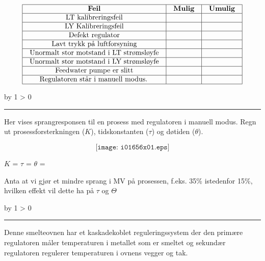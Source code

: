 \documentclass[12pt,a4paper]{article}
\def\oppgave{
            \advance\questnum by 1
            \ifnum \questnum > 0
                 \hrule
                 \vskip 3pt
                 \leftline{Oppgave \the\questnum}
                 \vskip 3pt \fi}
\begin{document}

$$\vbox{\offinterlineskip
\halign{\strut
\vrule \quad\hfil # \ \hfil & 
\vrule \quad\hfil # \ \hfil & 
\vrule \quad\hfil # \ \hfil \vrule \cr
\noalign{\hrule}
%
{\bf Feil} & {\bf Mulig} & {\bf Umulig} \cr
%
\noalign{\hrule}
%
LT kalibreringsfeil &  &  \cr
%
\noalign{\hrule}
%
LY Kalibreringsfeil &  &  \cr
%
\noalign{\hrule}
%
Defekt regulator &  &  \cr
%
\noalign{\hrule}
%
Lavt trykk på luftforsyning &  &  \cr
%
\noalign{\hrule}
%
Unormalt stor motstand i LT strømsløyfe &  &  \cr
%
\noalign{\hrule}
%
Unormalt stor motstand i LY strømsløyfe &  &  \cr
%
\noalign{\hrule}
%
Feedwater pumpe er slitt &  &  \cr
%
\noalign{\hrule}
%
Regulatoren står i manuell modus. &  &  \cr
%
\noalign{\hrule}
} %
}$$ %

\vskip 10pt \filbreak 
\oppgave{} 

Her vises sprangresponsen til en prosess med regulatoren i manuell modus. Regn ut prosessforsterkningen ($K$), tidskonstanten ($\tau$) og døtiden ($\theta$).


$$\texttt{[image: i01656x01.eps]}$$

$K$ = \underbar{\hskip 50pt} \hskip 50pt $\tau$ = \underbar{\hskip 50pt} \hskip 50pt $\theta$ = \underbar{\hskip 50pt}

\vskip 10pt

Anta at vi gjør et mindre sprang i MV på prosessen, f.eks. 35\% istedenfor 15\%, hvilken effekt vil dette ha på $\tau$ og $\Theta$


\vskip 10pt


\vskip 10pt \filbreak 
\oppgave{} 

Denne smelteovnen har et kaskadekoblet reguleringssystem der den primære regulatoren måler temperaturen i metallet som er smeltet og sekundær regulatoren regulerer temperaturen i ovnens vegger og tak. 

\end{document}
